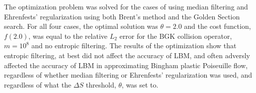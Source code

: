 The optimization problem was solved for the cases of using median filtering and Ehrenfests' regularization using both Brent's method and the Golden Section search.
For all four cases, the optimal solution was $\theta = 2.0$ and the cost function, $f(2.0)$, was equal to the relative $L_2$ error for the BGK collision operator, $m = 10^8$ and no entropic filtering.
The results of the optimization show that entropic filtering, at best did not affect the accuracy of LBM, and often adversly affected the accuracy of LBM in approximating Bingham plastic Poiseuille flow, regardless of whether median filtering or Ehrenfests' regularization was used, and regardless of what the $\Delta S$ threshold, $\theta$, was set to.

\newcommand{\figwid}{0.48\linewidth}

